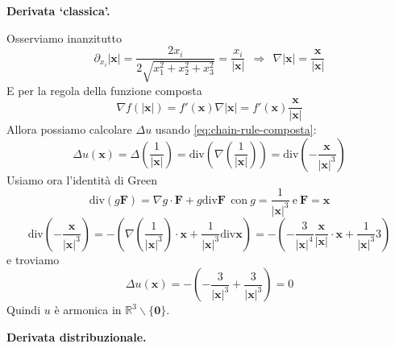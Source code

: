 \documentclass[10pt,a4paper,twoside,openright]{book}
\begin{document}
\textbf{Derivata `classica'.}

Osserviamo inanzitutto 
\begin{equation*}
	\partial _{x_{i}}| \mathbf{x}| =\frac{2x_{i}}{2\sqrt{x^{2}_{1} +x^{2}_{2} +x^{2}_{3}}} =\frac{x_{i}}{| \mathbf{x}| } \ \ \Rightarrow \ \ \nabla | \mathbf{x}| =\frac{\mathbf{x}}{| \mathbf{x}| }
\end{equation*}
E per la regola della funzione composta
\begin{equation}
	\nabla f(| \mathbf{x}| ) =f'(\mathbf{x}) \nabla | \mathbf{x}| =f'(\mathbf{x})\frac{\mathbf{x}}{| \mathbf{x}| }
	\label{eq:chain-rule-composta}
\end{equation}
Allora possiamo calcolare $\displaystyle \Delta u$ usando \eqref{eq:chain-rule-composta}:
\begin{equation*}
	\Delta u(\mathbf{x}) =\Delta \left(\frac{1}{| \mathbf{x}| }\right) =\mathrm{div}\left( \nabla \left(\frac{1}{| \mathbf{x}| }\right)\right) =\mathrm{div}\left( -\frac{\mathbf{x}}{| \mathbf{x}| ^{3}}\right)
\end{equation*}
Usiamo ora l'identità di Green 
\begin{equation*}
	\mathrm{div}( g\mathbf{F}) =\nabla g\cdotp \mathbf{F} +g\mathrm{div}\mathbf{F} \ \ \text{con} \ g=\frac{1}{| \mathbf{x}| ^{3}} \ \text{e} \ \mathbf{F} =\mathbf{x}
\end{equation*}
\begin{equation*}
	\mathrm{div}\left( -\frac{\mathbf{x}}{| \mathbf{x}| ^{3}}\right) =-\left( \nabla \left(\frac{1}{| \mathbf{x}| ^{3}}\right) \cdotp \mathbf{x} +\frac{1}{| \mathbf{x}| ^{3}}\mathrm{div}\mathbf{x}\right) =-\left( -\frac{3}{| \mathbf{x}| ^{4}}\frac{\mathbf{x}}{| \mathbf{x}| } \cdotp \mathbf{x} +\frac{1}{| \mathbf{x}| ^{3}} 3\right)
\end{equation*}
e troviamo
\begin{equation*}
	\Delta u(\mathbf{x}) =-\left( -\frac{3}{| \mathbf{x}| ^{3}} +\frac{3}{| \mathbf{x}| ^{3}}\right) =0
\end{equation*}
Quindi $\displaystyle u$ è armonica in $\displaystyle \mathbb{R}^{3} \backslash \{\mathbf{0}\}$.



\textbf{Derivata distribuzionale.}
\end{document}
